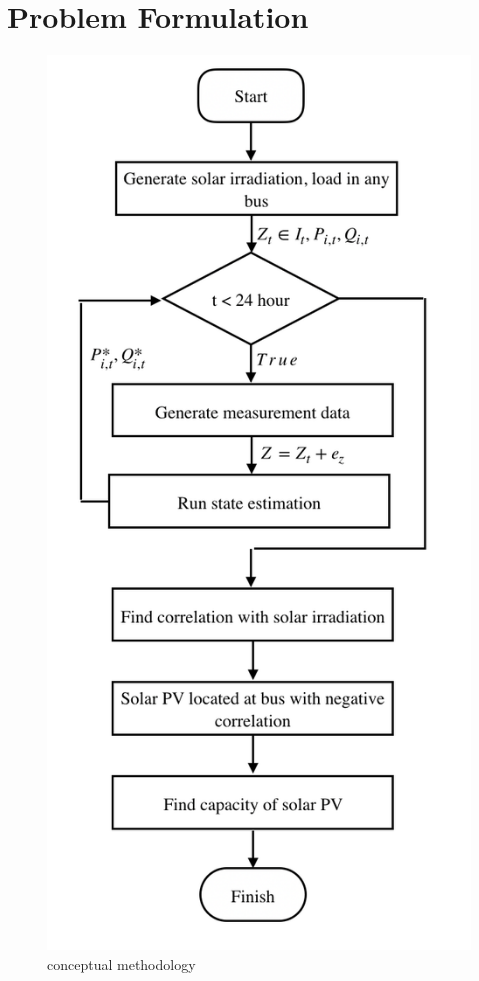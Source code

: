 \section{Problem Formulation}

\begin{figure}[h!]
  \center
  \includegraphics[scale=0.5]{images/conceptual_methodology.png}
  \caption{conceptual methodology}
  \label{fig.method}
\end{figure}

